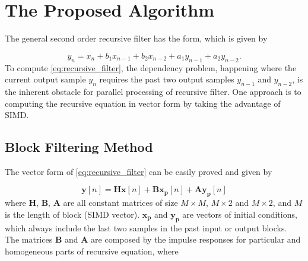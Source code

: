 \section{The Proposed Algorithm}
\label{sec:algorithm}

The general second order recursive filter has the form, which is given by

\begin{equation}
    \label{eq:recursive_filter}
    y_n = x_n + b_1x_{n-1} + b_2x_{n-2} + a_1y_{n-1} + a_2y_{n-2}.
\end{equation}
To compute \eqref{eq:recursive_filter}, the dependency problem, happening where the current output sample $y_n$
requires the past two output samples $y_{n-1}$ and $y_{n-2}$, is the inherent obstacle for parallel processing of recursive filter.
One approach is to computing the recursive equation in vector form by taking the advantage of SIMD. 


\subsection{Block Filtering Method}

The vector form of \eqref{eq:recursive_filter} can be easily proved and given by

\begin{equation}
    \label{eq:block_filtering}
    \bm{y}[n] = \bm{H}\bm{x}[n] + \bm{B}\bm{x_p}[n] + \bm{A}\bm{y_p}[n] 
\end{equation}
where $\bm{H}$, $\bm{B}$, $\bm{A}$ are all constant matrices of size $M \times M$, $M \times 2$ and $M \times 2$,
and $M$ is the length of block (SIMD vector). $\bm{x_p}$ and $\bm{y_p}$ are vectors of initial conditions, 
which always include the last two samples in the past input or output blocks.
The matrices $\bm{B}$ and $\bm{A}$ are composed by the impulse responses for particular and homogeneous parts of recursive equation, where

